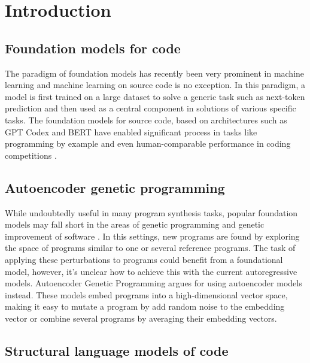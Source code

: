 \section{Introduction}

\subsection{Foundation models for code}
The paradigm of foundation models \cite{foundation-models} has recently been very prominent in machine learning and machine learning on source code is no exception.
In this paradigm, a model is first trained on a large dataset to solve a generic task such as next-token prediction and then used as a central component in solutions of various specific tasks.
The foundation models for source code, based on architectures such as GPT Codex \cite{gpt,chenEvaluatingLargeLanguage2021,codegen,gpt-neo} and BERT \cite{devlinBERTPretrainingDeep2019,codebert} have enabled significant process in tasks like programming by example \cite{halbertProgrammingExample1984} and even human-comparable performance in coding competitions \cite{liCompetitionLevelCodeGeneration2022}.

\subsection{Autoencoder genetic programming}
While undoubtedly useful in many program synthesis tasks, popular foundation models may fall short in the areas of genetic programming \cite{koza1992genetic} and genetic improvement of software \cite{petke2017genetic}.
In this settings, new programs are found by exploring the space of programs similar to one or several reference programs.
The task of applying these perturbations to programs could benefit from a foundational model, however, it's unclear how to achieve this with the current autoregressive models.
Autoencoder Genetic Programming \cite{autoenc-gp,denoising-autoenc-gp,latentspaceopt} argues for using autoencoder \cite{autoencoders} models instead.
These models embed programs into a high-dimensional vector space, making it easy to mutate a program by add random noise to the embedding vector or combine several programs by averaging their embedding vectors.

\subsection{Structural language models of code}

